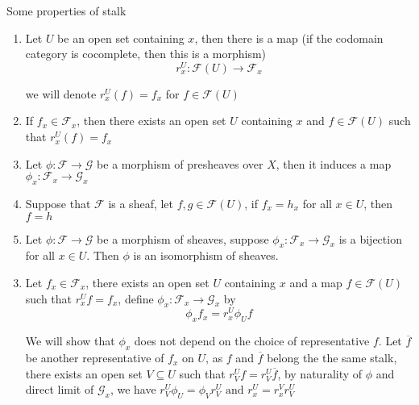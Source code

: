 \begin{remark}
	Some properties of stalk
	\begin{enumerate}
		\item Let $U$ be an open set containing $x$, then there is a map (if the codomain category is cocomplete, then this is a morphism)
		$$
			r^U_x: \mathcal{F}(U) \to \mathcal{F}_x
		$$
		
		we will denote $r^U_x(f) = f_x$ for $f \in \mathcal{F}(U)$
		
		\item If $f_x \in \mathcal{F}_x$, then there exists an open set $U$ containing $x$ and $f \in \mathcal{F}(U)$ such that $r^U_x(f) = f_x$
		
		\item Let $\phi: \mathcal{F} \to \mathcal{G}$ be a morphism of presheaves over $X$, then it induces a map $\phi_x: \mathcal{F}_x \to \mathcal{G}_x$
		
		\item Suppose that $\mathcal{F}$ is a sheaf, let $f, g \in \mathcal{F}(U)$, if $f_x = h_x$ for all $x \in U$, then $f = h$
		
		\item Let $\phi: \mathcal{F} \to \mathcal{G}$ be a morphism of sheaves, suppose $\phi_x: \mathcal{F}_x \to \mathcal{G}_x$ is a bijection for all $x \in U$. Then $\phi$ is an isomorphism of sheaves.
	\end{enumerate}    
	\begin{longproof}
		\begin{enumerate}
			\setcounter{enumi}{2}
			\item Let $f_x \in \mathcal{F}_x$, there exists an open set $U$ containing $x$ and a map $f \in \mathcal{F}(U)$ such that $r^U_x f = f_x$, define $\phi_x: \mathcal{F}_x \to \mathcal{G}_x$ by
			$$
				\phi_x f_x = r^U_x \phi_U f
			$$
			
			We will show that $\phi_x$ does not depend on the choice of representative $f$. Let $\overline{f}$ be another representative of $f_x$ on $U$, as $f$ and $\overline{f}$ belong the the same stalk, there exists an open set $V \subseteq U$ such that $r^U_V f = r^U_V \overline{f}$, by naturality of $\phi$ and direct limit of $\mathcal{G}_x$, we have $r^U_V \phi_U = \phi_V r^U_V \text{ and } r^U_x = r^V_x r^U_V$
			\begin{center}
			\end{center}
			

\end{enumerate}
\end{longproof}
\end{remark}
